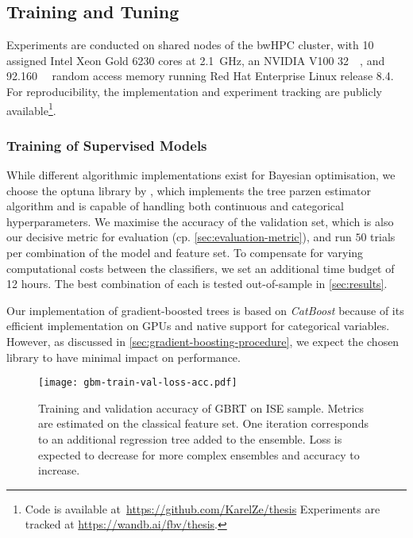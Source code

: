 
\subsection{Training and Tuning}\label{sec:training-and-tuning}

Experiments are conducted on shared nodes of the bwHPC cluster, with 10 assigned Intel Xeon Gold 6230 cores at \SI{2.1}{\GHz}, an NVIDIA V100 \SI{32}{\giga\byte}, and \SI{92.160}{\giga\byte} random access memory running Red Hat Enterprise Linux release 8.4. For reproducibility, the implementation and experiment tracking are publicly available\footnote{Code is available at~\url{https://github.com/KarelZe/thesis} Experiments are tracked at \url{https://wandb.ai/fbv/thesis}.}.

\subsubsection{Training of Supervised
    Models}\label{sec:training-of-supervised-models}

While different algorithmic implementations exist for Bayesian optimisation, we choose the optuna library by \textcite[][1--10]{akibaOptunaNextgenerationHyperparameter2019}, which implements the tree parzen estimator algorithm and is capable of handling both continuous and categorical hyperparameters. We maximise the accuracy of the validation set, which is also our decisive metric for evaluation (cp. \cref{sec:evaluation-metric}), and run $50$ trials per combination of the model and feature set. To compensate for varying computational costs between the classifiers, we set an additional time budget of 12 hours. The best combination of each is tested out-of-sample in \cref{sec:results}.

Our implementation of gradient-boosted trees is based on \emph{CatBoost} \autocite[][5--6]{prokhorenkovaCatBoostUnbiasedBoosting2018} because of its efficient implementation on \glspl{GPU} and native support for categorical variables. However, as discussed in \cref{sec:gradient-boosting-procedure}, we expect the chosen library to have minimal impact on performance.

\begin{figure}[ht]
    \centering
    \texttt{[image: gbm-train-val-loss-acc.pdf]}
    \caption[Training and Validation Accuracy of  on  Sample]{Training and validation accuracy of \gls{GBRT} on \gls{ISE} sample. Metrics are estimated on the classical feature set. One iteration corresponds to an additional regression tree added to the ensemble. Loss is expected to decrease for more complex ensembles and accuracy to increase.}
    \label{fig:gbm-train-val-loss-acc}
\end{figure}

